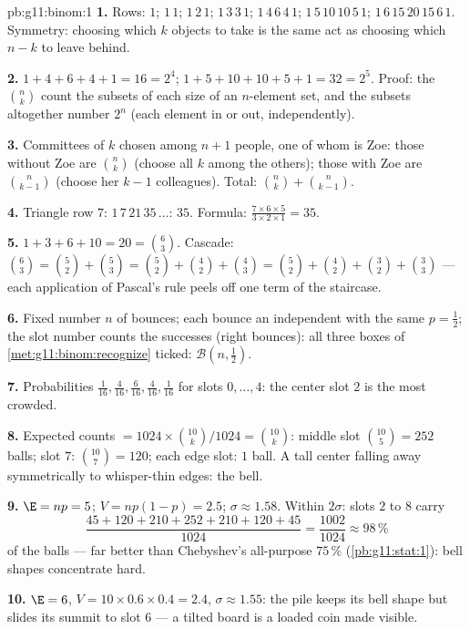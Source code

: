 \begin{solution}{pb:g11:binom:1}
\textbf{1.} Rows: $1$; $1\,1$; $1\,2\,1$; $1\,3\,3\,1$;
$1\,4\,6\,4\,1$; $1\,5\,10\,10\,5\,1$;
$1\,6\,15\,20\,15\,6\,1$. Symmetry: choosing which $k$ objects
to take is the same act as choosing which $n - k$ to leave
behind.

\textbf{2.} $1 + 4 + 6 + 4 + 1 = 16 = 2^4$;
$1 + 5 + 10 + 10 + 5 + 1 = 32 = 2^5$. Proof: the
$\binom nk$ count the subsets of each size of an $n$-element
set, and the subsets altogether number $2^n$ (each element in
or out, independently).

\textbf{3.} Committees of $k$ chosen among $n + 1$ people, one
of whom is Zoe: those without Zoe are $\binom nk$ (choose all
$k$ among the others); those with Zoe are $\binom{n}{k-1}$
(choose her $k - 1$ colleagues). Total:
$\binom nk + \binom{n}{k-1}$.

\textbf{4.} Triangle row $7$: $1\,7\,21\,35\,\dots$: $35$.
Formula: $\frac{7 \times 6 \times 5}{3 \times 2 \times 1} =
35$.

\textbf{5.} $1 + 3 + 6 + 10 = 20 = \binom63$. Cascade:
$\binom63 = \binom52 + \binom53 = \binom52 + \binom42 +
\binom43 = \binom52 + \binom42 + \binom32 + \binom33$ ---
each application of Pascal's rule peels off one term of the
staircase.

\textbf{6.} Fixed number $n$ of bounces; each bounce an
independent  with the same $p = \frac12$; the
slot number counts the successes (right bounces): all three
boxes of \cref{met:g11:binom:recognize} ticked:
$\mathcal B\!\left(n, \frac12\right)$.

\textbf{7.} Probabilities $\frac{1}{16}, \frac{4}{16},
\frac{6}{16}, \frac{4}{16}, \frac{1}{16}$ for slots
$0, \dots, 4$: the center slot $2$ is the most crowded.

\textbf{8.} Expected counts $= 1024 \times
\binom{10}{k}/1024 = \binom{10}{k}$: middle slot
$\binom{10}{5} = 252$ balls; slot $7$: $\binom{10}{7} = 120$;
each edge slot: $1$ ball. A tall center falling away
symmetrically to whisper-thin edges: the bell.

\textbf{9.} $\E = np = 5$; $V = np(1 - p) = 2.5$;
$\sigma \approx 1.58$. Within $2\sigma$: slots $2$ to $8$
carry
\[
\frac{45 + 120 + 210 + 252 + 210 + 120 + 45}{1024}
= \frac{1002}{1024} \approx 98\,\%
\]
of the balls --- far better
than Chebyshev's all-purpose $75\,\%$
(\cref{pb:g11:stat:1}): bell shapes concentrate hard.

\textbf{10.} $\E = 6$, $V = 10 \times 0.6 \times 0.4 = 2.4$,
$\sigma \approx 1.55$: the pile keeps its bell shape but
slides its summit to slot $6$ --- a tilted board is a loaded
coin made visible.


\end{solution}
